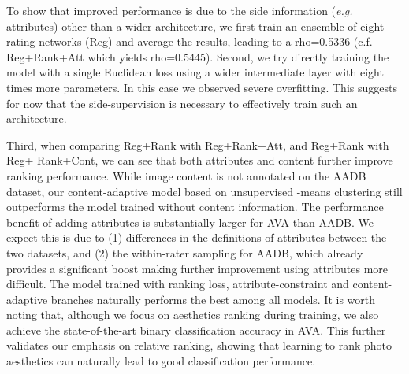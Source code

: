 \documentclass[runningheads]{llncs}
\def\eg{\emph{e.g. }}
\begin{document}
To show that improved performance is due to the side information (\eg attributes) other than a wider architecture,
we first train an ensemble of eight rating networks (Reg) and average the results, leading to a rho=0.5336 (c.f. Reg+Rank+Att which yields rho=0.5445).
Second, we try directly training the model with a single Euclidean loss using a wider intermediate layer with eight times more parameters. In this case we observed severe overfitting. This suggests for now that the side-supervision is necessary to effectively train such an architecture.

Third, when comparing Reg+Rank with Reg+Rank+Att, and Reg+Rank with Reg+
Rank+Cont, we can see that both attributes and content further improve
ranking performance.  While image content is not annotated on the AADB dataset,
our content-adaptive model based on unsupervised -means clustering still
outperforms the model trained without content information.  The performance
benefit of adding attributes is substantially larger for AVA than AADB.
We expect this is due to (1) differences in the definitions of attributes between
the two datasets, and (2) the within-rater sampling for AADB, which already
provides a significant boost making further improvement using attributes more
difficult.  The model trained with ranking loss, attribute-constraint and
content-adaptive branches naturally performs the best among all models.  It is
worth noting that, although we focus on aesthetics ranking during training, we
also achieve the state-of-the-art binary classification accuracy in AVA.  This
further validates our emphasis on relative ranking, showing that learning to
rank photo aesthetics can naturally lead to good classification performance.
\end{document}
